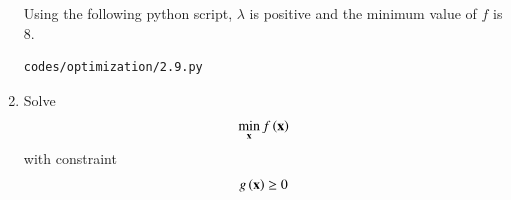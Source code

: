 \begin{enumerate}[label=\arabic*.,ref=\thesubsection.\theenumi]
%
\solution
Using the following python script, $\lambda$ is positive and the minimum value of $f$ is 8.
%	
\begin{lstlisting}
codes/optimization/2.9.py
\end{lstlisting}

%
%
\item
\label{ch2_prob_upper_cond}
Solve
	 \begin{align}
	\min_{\mathbf{x}} f\left(\mathbf{x}\right) 
	 \end{align}
	 with constraint
	 \begin{align}
	 g\left(\mathbf{x}\right) 
\geq 0 
	 \end{align}
	 

\end{enumerate}

